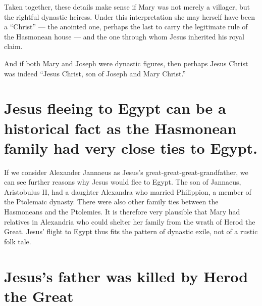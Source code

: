 Taken together, these details make sense if Mary was not merely a villager, but the rightful dynastic heiress.
Under this interpretation she may herself have been a “Christ” --- the anointed one, perhaps the last to carry the legitimate rule of the Hasmonean house --- and the one through whom Jesus inherited his royal claim.

And if both Mary and Joseph were dynastic figures, then perhaps Jesus Christ was indeed “Jesus Christ, son of Joseph and Mary Christ.”

\section{Jesus fleeing to Egypt can be a historical fact as the Hasmonean family had very close ties to Egypt.}\label{sec:jesus-fleeing-to-egypt-can-be-a-historical-fact-as-the-hasmonean-family-had-very-close-ties-to-egypt.}

If we consider Alexander Jannaeus as Jesus’s great-great-great-grandfather, we can see further reasons why Jesus would flee to Egypt.
The son of Jannaeus, Aristobulus II, had a daughter Alexandra who married Philippion, a member of the Ptolemaic dynasty.
There were also other family ties between the Hasmoneans and the Ptolemies.
It is therefore very plausible that Mary had relatives in Alexandria who could shelter her family from the wrath of Herod the Great.
Jesus’ flight to Egypt thus fits the pattern of dynastic exile, not of a rustic folk tale.

\section{Jesus's father was killed by Herod the Great}\label{par:jesuss-father-was-killed-by-herod-the-great}

